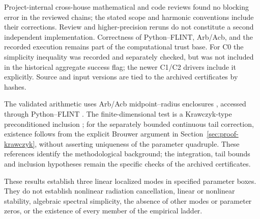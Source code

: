 Project-internal cross-house mathematical and code reviews found no blocking error in
the reviewed chains; the stated scope and harmonic conventions include
their corrections. Review and higher-precision reruns do not constitute
a second independent implementation. Correctness of Python--FLINT,
Arb/Acb, and the recorded execution remains part of the computational
trust base. For C0 the simplicity inequality was recorded and separately
checked, but was not included in the historical aggregate success flag;
the newer C1/C2 drivers include it explicitly. Source and input versions
are tied to the archived certificates by hashes.

The validated arithmetic uses Arb/Acb midpoint--radius enclosures
\cite{Johansson2017Arb}, accessed through Python--FLINT
\cite{PythonFlintDocs,FlintSoftware}.
The finite-dimensional test is a Krawczyk-type preconditioned inclusion
\cite{Krawczyk1969}; for the separately bounded continuous tail correction,
existence follows from the explicit Brouwer argument in
Section~\ref{sec:proof-krawczyk}, without asserting uniqueness of the
parameter quadruple. These references identify the methodological
background; the integration, tail bounds and inclusion hypotheses remain
the specific checks of the archived certificates.

These results establish three linear localized modes in specified
parameter boxes. They do not establish nonlinear radiation cancellation,
linear or nonlinear stability, algebraic spectral simplicity, the absence of other
modes or parameter zeros, or the existence of every member of the
empirical ladder.
